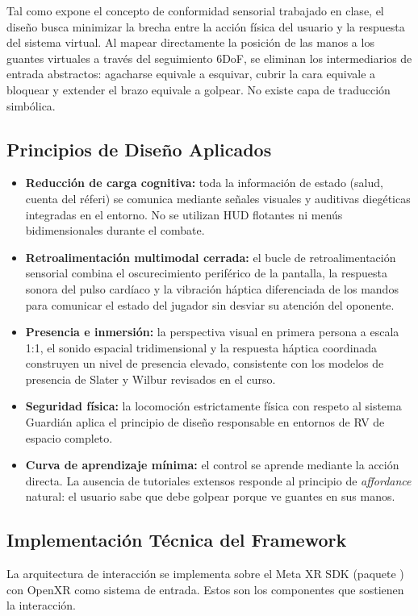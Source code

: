 Tal como expone el concepto de conformidad sensorial trabajado en clase, el diseño busca minimizar la brecha entre la acción física del usuario y la respuesta del sistema virtual. Al mapear directamente la posición de las manos a los guantes virtuales a través del seguimiento 6DoF, se eliminan los intermediarios de entrada abstractos: agacharse equivale a esquivar, cubrir la cara equivale a bloquear y extender el brazo equivale a golpear. No existe capa de traducción simbólica.

\subsection{Principios de Diseño Aplicados}
\begin{itemize}
  \item \textbf{Reducción de carga cognitiva:} toda la información de estado (salud, cuenta del réferi) se comunica mediante señales visuales y auditivas diegéticas integradas en el entorno. No se utilizan HUD flotantes ni menús bidimensionales durante el combate.
  \item \textbf{Retroalimentación multimodal cerrada:} el bucle de retroalimentación sensorial combina el oscurecimiento periférico de la pantalla, la respuesta sonora del pulso cardíaco y la vibración háptica diferenciada de los mandos para comunicar el estado del jugador sin desviar su atención del oponente.
  \item \textbf{Presencia e inmersión:} la perspectiva visual en primera persona a escala 1:1, el sonido espacial tridimensional y la respuesta háptica coordinada construyen un nivel de presencia elevado, consistente con los modelos de presencia de Slater y Wilbur revisados en el curso.
  \item \textbf{Seguridad física:} la locomoción estrictamente física con respeto al sistema Guardián aplica el principio de diseño responsable en entornos de RV de espacio completo.
  \item \textbf{Curva de aprendizaje mínima:} el control se aprende mediante la acción directa. La ausencia de tutoriales extensos responde al principio de \emph{affordance} natural: el usuario sabe que debe golpear porque ve guantes en sus manos.
\end{itemize}

\subsection{Implementación Técnica del Framework}
La arquitectura de interacción se implementa sobre el Meta XR SDK (paquete ) con OpenXR como sistema de entrada. Estos son los componentes que sostienen la interacción.


